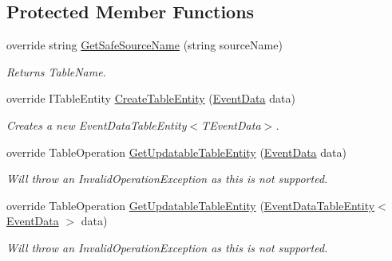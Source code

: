 \subsection*{Protected Member Functions}
\begin{DoxyCompactItemize}
\item 
override string \hyperlink{classCqrs_1_1Azure_1_1BlobStorage_1_1Events_1_1TableStorageEventStore_1_1RawTableStorageEventStore_ab02dd26098d25c2663abdf3da9f57f0f_ab02dd26098d25c2663abdf3da9f57f0f}{Get\+Safe\+Source\+Name} (string source\+Name)
\begin{DoxyCompactList}\small\item\em Returns Table\+Name. \end{DoxyCompactList}\item 
override I\+Table\+Entity \hyperlink{classCqrs_1_1Azure_1_1BlobStorage_1_1Events_1_1TableStorageEventStore_1_1RawTableStorageEventStore_a916cc6bc33379535690aa0c2e7e90554_a916cc6bc33379535690aa0c2e7e90554}{Create\+Table\+Entity} (\hyperlink{classCqrs_1_1Events_1_1EventData}{Event\+Data} data)
\begin{DoxyCompactList}\small\item\em Creates a new Event\+Data\+Table\+Entity$<$\+T\+Event\+Data$>$. \end{DoxyCompactList}\item 
override Table\+Operation \hyperlink{classCqrs_1_1Azure_1_1BlobStorage_1_1Events_1_1TableStorageEventStore_1_1RawTableStorageEventStore_afa1fdd2a115ebf6e12411f8a9e7029a9_afa1fdd2a115ebf6e12411f8a9e7029a9}{Get\+Updatable\+Table\+Entity} (\hyperlink{classCqrs_1_1Events_1_1EventData}{Event\+Data} data)
\begin{DoxyCompactList}\small\item\em Will throw an Invalid\+Operation\+Exception as this is not supported. \end{DoxyCompactList}\item 
override Table\+Operation \hyperlink{classCqrs_1_1Azure_1_1BlobStorage_1_1Events_1_1TableStorageEventStore_1_1RawTableStorageEventStore_a36cc2b354b0e2dc33a032473e459c8ec_a36cc2b354b0e2dc33a032473e459c8ec}{Get\+Updatable\+Table\+Entity} (\hyperlink{classCqrs_1_1Azure_1_1BlobStorage_1_1EventDataTableEntity}{Event\+Data\+Table\+Entity}$<$ \hyperlink{classCqrs_1_1Events_1_1EventData}{Event\+Data} $>$ data)
\begin{DoxyCompactList}\small\item\em Will throw an Invalid\+Operation\+Exception as this is not supported. \end{DoxyCompactList}\end{DoxyCompactItemize}
